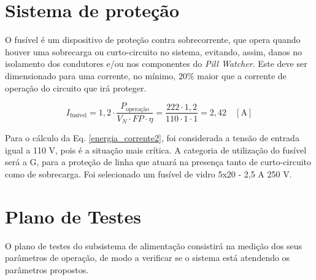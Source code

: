 


\section{Sistema de proteção}

O fusível é um dispositivo de proteção contra sobrecorrente, que opera quando houver uma sobrecarga ou curto-circuito no sistema, evitando, assim, danos no isolamento dos condutores e/ou nos componentes do \textit{Pill Watcher}. Este deve ser dimensionado para uma corrente, no mínimo, 20\% maior que a corrente de operação do circuito que irá proteger.

    \begin{equation}
        I_\text{fusível} = 1,2 \cdot \frac{P_\text{operação}}{V_{N} \cdot FP \cdot \eta} = \frac{222 \cdot 1,2}{110 \cdot 1 \cdot 1} = 2,42 \quad [\text{A}]
        \label{energia_corrente2}
    \end{equation}
    
Para o cálculo da Eq. \ref{energia_corrente2}, foi considerada a tensão de entrada igual a 110 V, pois é a situação mais crítica. A categoria de utilização do fusível será a G, para a proteção de linha que atuará na presença tanto de curto-circuito como de sobrecarga. Foi selecionado um fusível de vidro 5x20 - 2,5 A 250 V. 

\section{Plano de Testes}\label{sec:plano_teste_energia}

O plano de testes do subsistema de alimentação consistirá na medição dos seus parâmetros de operação, de modo a verificar se o sistema está atendendo os parâmetros propostos. 

